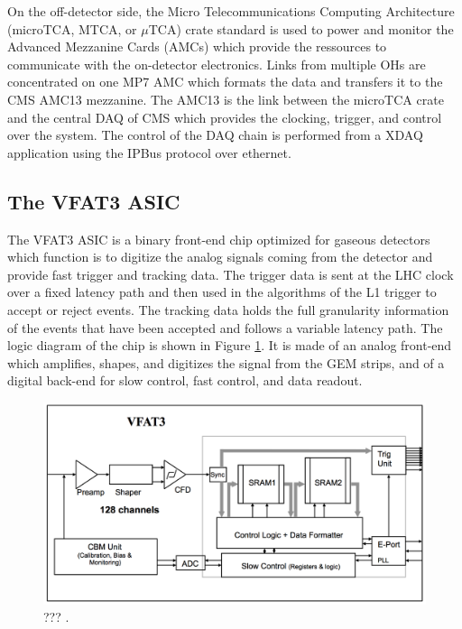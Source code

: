     On the off-detector side, the Micro Telecommunications Computing Architecture (microTCA, MTCA, or $\mu$TCA) \cite{PICMG} crate standard is used to power and monitor the Advanced Mezzanine Cards (AMCs) which provide the ressources to communicate with the on-detector electronics. Links from multiple OHs are concentrated on one MP7 AMC which formats the data and transfers it to the CMS AMC13 mezzanine. The AMC13 is the link between the microTCA crate and the central DAQ of CMS which provides the clocking, trigger, and control over the system. The control of the DAQ chain is performed from a XDAQ application using the IPBus protocol over ethernet.

    \subsection{The VFAT3 ASIC}

      The VFAT3 ASIC is a binary front-end chip optimized for gaseous detectors which function is to digitize the analog signals coming from the detector and provide fast trigger and tracking data. The trigger data is sent at the LHC clock over a fixed latency path and then used in the algorithms of the L1 trigger to accept or reject events. The tracking data holds the full granularity information of the events that have been accepted and follows a variable latency path. The logic diagram of the chip is shown in Figure \ref{fig:II-2-daq-vfat3}. It is made of an analog front-end which amplifies, shapes, and digitizes the signal from the GEM strips, and of a digital back-end for slow control, fast control, and data readout. \\

      \begin{figure}[h!]
        \centering
        \includegraphics[width=\textwidth]{img/II-2-daq/vfat3.pdf}
        \caption{??? \cite{Colaleo:2021453}.}
        \label{fig:II-2-daq-vfat3}
      \end{figure}

